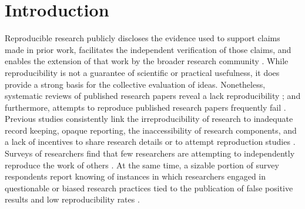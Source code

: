 \documentclass[]{interact}
\newcommand{\citep}{\parencite}
\theoremstyle{plain}%
\theoremstyle{definition}
\theoremstyle{remark}
\begin{document}
\newpage
\section*{Introduction}
Reproducible research publicly discloses the evidence used to support claims made in prior work, facilitates the independent verification of those claims, and enables the extension of that work by the broader research community \citep{earp2015, nosek2012scientific, Schmidt2009}.
While reproducibility is not a guarantee of scientific or practical usefulness, it does provide a strong basis for the collective evaluation of ideas.
Nonetheless, systematic reviews of published research papers reveal a lack reproducibility \citep{moraila2014measuring, iqbal2016reproducible}; and furthermore, attempts to reproduce published research papers frequently fail \citep{raghupathi2022reproducibility, chang2015economics}.
Previous studies consistently link the irreproducibility of research to inadequate record keeping, opaque reporting, the inaccessibility of research components, and a lack of incentives to share research details or to attempt reproduction studies \citep{ranstam2000fraud, anderson2007normative, NASEM2019}.
Surveys of researchers find that few researchers are attempting to independently reproduce the work of others \citep{baker20161, boulbes2018survey}.
At the same time, a sizable portion of survey respondents report knowing of instances in which researchers engaged in questionable or biased research practices tied to the publication of false positive results and low reproducibility rates \citep{fanelli2009many, fraser2018questionable}.
\end{document}
